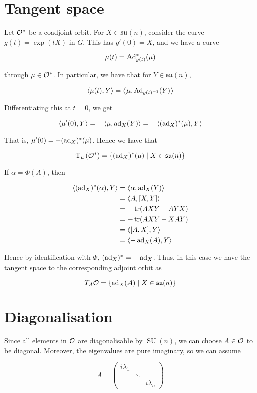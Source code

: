 \documentclass{article}
\DeclareMathOperator{\SU}{SU}
\newcommand{\su}{\mathfrak{su}}
\begin{document}
\section{Tangent space}

Let \(\mathcal{O}^*\) be a coadjoint orbit. For \(X \in \su(n)\), consider the curve \(g(t) = \exp(tX)\) in \(G\). This has \(g'(0) = X\), and we have a curve

\[\mu(t) = \operatorname{Ad}_{g(t)}^*(\mu)\]

through \(\mu \in \mathcal{O}^*\). In particular, we have that for \(Y \in \su(n)\),

\[\left\langle \mu(t), Y \right\rangle = \left\langle \mu, \operatorname{Ad}_{g(t)^{-1}}(Y) \right\rangle\]

Differentiating this at \(t = 0\), we get

\[\left\langle \mu'(0), Y \right\rangle = -\left\langle \mu, \operatorname{ad}_X(Y) \right\rangle = -\left\langle (\operatorname{ad}_X)^*(\mu), Y \right\rangle\]

That is, \(\mu'(0) = -(\operatorname{ad}_X)^*(\mu)\). Hence we have that

\[\T_\mu\left(\mcO^*\right) = \left\{(\ad_X)^*(\mu) \mid X \in \su(n)\right\}\]

If \(\alpha= \Phi(A)\), then

\begin{align*}
    \left\langle (\operatorname{ad}_X)^*(\alpha), Y \right\rangle &= \left\langle \alpha, \operatorname{ad}_X(Y) \right\rangle \\
    &= \left\langle A, [X, Y] \right\rangle \\
    &= -\tr(AXY - AYX) \\
    &= -\tr(AXY - XAY) \\
    &= \left\langle [A, X], Y \right\rangle \\
    &= \left\langle -\operatorname{ad}_X(A), Y \right\rangle
\end{align*}

Hence by identification with \(\Phi\), \((\operatorname{ad}_X)^* = -\operatorname{ad}_X\). Thus, in this case we have the tangent space to the corresponding adjoint orbit as

\[T_A\mcO = \left\{\ad_X(A) \mid X \in \su(n)\right\}\]

\section{Diagonalisation}

Since all elements in \(\mathcal{O}\) are diagonalisable by \(\SU(n)\), we can choose \(A \in \mathcal{O}\) to be diagonal. Moreover, the eigenvalues are pure imaginary, so we can assume

\[A = \begin{pmatrix}
    i\lambda_1 & \\
    & \ddots & \\
    & & i\lambda_n
\end{pmatrix}\]
\end{document}
